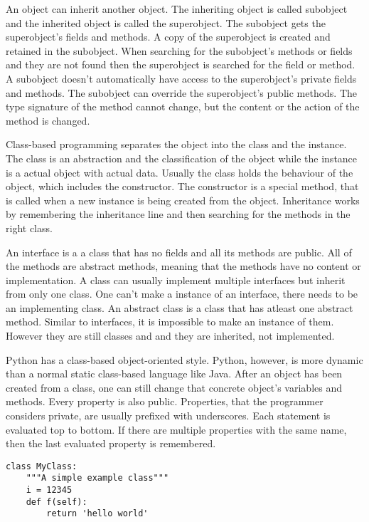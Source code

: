 An object can inherit another object. The inheriting object is called subobject and the inherited object is called the superobject. The subobject gets the superobject's fields and methods. A copy of the superobject is created and retained in the subobject. When searching for the subobject's methods or fields and they are not found then the superobject is searched for the field or method. A subobject doesn't automatically have access to the superobject's private fields and methods. The subobject can override the superobject's public methods. The type signature of the method cannot change, but the content or the action of the method is changed.

Class-based programming separates the object into the class and the instance.
The class is an abstraction and the classification of the object while the
instance is a actual object with actual data. Usually the class holds the
behaviour of the object, which includes the constructor. The constructor is a
special method, that is called when a new instance is being created from the
object. Inheritance works by remembering the inheritance line and then searching
for the methods in the right class.

An interface is a a class that has no fields and all its methods are public. All
of the methods are abstract methods, meaning that the methods have no content or
implementation. A class can usually implement multiple interfaces but inherit
from only one class. One can't make a instance of an interface, there needs to
be an implementing class. An abstract class is a class that has atleast one
abstract method. Similar to interfaces, it is impossible to make an instance of
them. However they are still classes and and they are inherited, not
implemented.

Python has a class-based object-oriented style. Python, however, is more dynamic
than a normal static class-based language like Java. After an object has been
created from a class, one can still change that concrete object's variables and
methods. Every property is also public. Properties, that the programmer
considers private, are usually prefixed with underscores. Each statement is
evaluated top to bottom. If there are multiple properties with the same name,
then the last evaluated property is remembered.
\begin{verbatim}
class MyClass:
    """A simple example class"""
    i = 12345
    def f(self):
        return 'hello world'
\end{verbatim}

